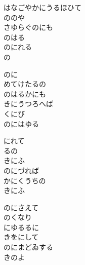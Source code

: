 \documentclass[10pt,b5j]{tarticle} %
\begin{document}
\vspace{1.5em} %
\newcommand{\linespace}{0.5em} %
\newcommand{\blocksize}{0.5\hsize} %
\begin{enumerate} %
    \begin{minipage}[c]{\blocksize}
    
        \vspace{\linespace}
        \item
        はなごやかにうるほひて\\
        ののや\\
        さゆらぐのにも\\
        のはる\\
        のにれる\\
        の
        
        \vspace{\linespace}
        \item
        のに\\
        めてけたるの\\
        のはるかにも\\
        きにうつろへば\\
        くにび\\
        のにはゆる
        
        \vspace{\linespace}
        \item
        にれて\\
        るの\\
        きにふ\\
        のにづれば\\
        かにくうちの\\
        きにふ
        
        \vspace{\linespace}
        \item
        のにさえて\\
        のくなり\\
        にゆるるに\\
        きをにして\\
        のにまどゐする\\
        きのよ
        

\end{minipage}
\end{enumerate}
\end{document}
